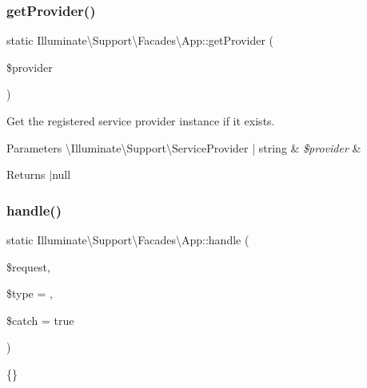 \subsubsection{\texorpdfstring{get\+Provider()}{getProvider()}}
{\footnotesize\ttfamily static Illuminate\textbackslash{}\+Support\textbackslash{}\+Facades\textbackslash{}\+App\+::get\+Provider (\begin{DoxyParamCaption}\item[{}]{\$provider }\end{DoxyParamCaption})\hspace{0.3cm}{\ttfamily [static]}}

Get the registered service provider instance if it exists.


\begin{DoxyParams}[1]{Parameters}
\textbackslash{}\+Illuminate\textbackslash{}\+Support\textbackslash{}\+Service\+Provider | string & {\em \$provider} & \\
\hline
\end{DoxyParams}
\begin{DoxyReturn}{Returns}
$\vert$null 
\end{DoxyReturn}
\mbox{\label{class_illuminate_1_1_support_1_1_facades_1_1_app_a291c55e10567a9c70b8df904fbfc0dcf}} 
\subsubsection{\texorpdfstring{handle()}{handle()}}
{\footnotesize\ttfamily static Illuminate\textbackslash{}\+Support\textbackslash{}\+Facades\textbackslash{}\+App\+::handle (\begin{DoxyParamCaption}\item[{}]{\$request,  }\item[{}]{\$type = {},  }\item[{}]{\$catch = {\ttfamily true} }\end{DoxyParamCaption})\hspace{0.3cm}{\ttfamily [static]}}

\{\} \mbox{\label{class_illuminate_1_1_support_1_1_facades_1_1_app_a86f6f04a4b68b1a96c67b8b5cd5e1c39}} 
